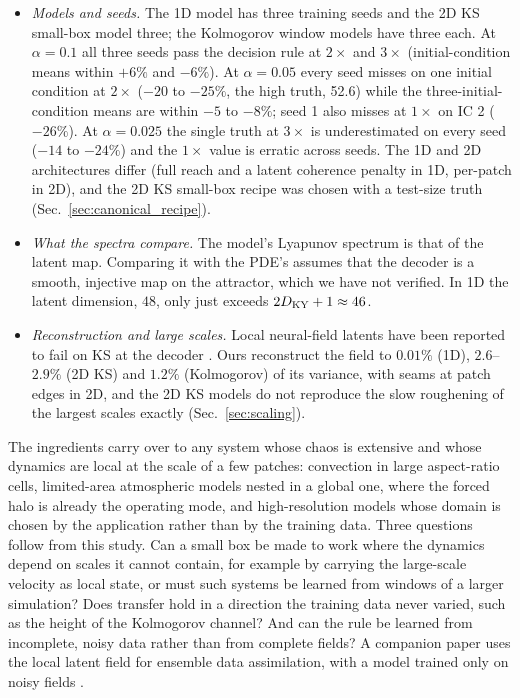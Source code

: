 \begin{itemize}
  scatter of single evaluations, the boundary at $\alpha=0.1$ and $2\times$ is
  not.
\item \emph{Models and seeds.} The 1D model has three training seeds and
  the 2D KS small-box model three; the Kolmogorov window models have three each.
  At $\alpha=0.1$ all three seeds pass the decision rule at $2\times$ and $3\times$
  (initial-condition means within $+6\%$ and $-6\%$). At $\alpha=0.05$ every seed
  misses on one initial condition at $2\times$ ($-20$ to $-25\%$, the high truth, 52.6)
  while the three-initial-condition means are within $-5$ to $-8\%$; seed 1 also misses at $1\times$ on IC 2 ($-26\%$). At $\alpha=0.025$
  the single truth at $3\times$ is underestimated on every seed ($-14$ to $-24\%$) and the
  $1\times$ value is erratic across seeds. The
  1D and 2D architectures differ (full reach and a latent coherence
  penalty in 1D, per-patch in 2D), and the 2D KS small-box recipe was
  chosen with a test-size truth (Sec.~\ref{sec:canonical_recipe}).
\item \emph{What the spectra compare.} The model's Lyapunov spectrum is
  that of the latent map. Comparing it with the PDE's assumes that the
  decoder is a smooth, injective map on the attractor, which we have not
  verified. In 1D the latent dimension, $48$, only just exceeds
  $2D_{\mathrm{KY}}+1\approx46$.
\item \emph{Reconstruction and large scales.} Local neural-field latents
  have been reported to fail on KS at the decoder \citep{aroma2024}. Ours
  reconstruct the field to $0.01\%$ (1D), $2.6$--$2.9\%$ (2D KS) and $1.2\%$
  (Kolmogorov) of its variance, with seams at patch edges in 2D, and the
  2D KS models do not reproduce the slow roughening of the largest scales
  exactly (Sec.~\ref{sec:scaling}).
\end{itemize}

 The ingredients carry over to any system whose chaos is
extensive and whose dynamics are local at the scale of a few patches:
convection in large aspect-ratio cells, limited-area atmospheric models
nested in a global one, where the forced halo is already the operating
mode, and high-resolution models whose domain is chosen by the
application rather than by the training data. Three questions follow
from this study. Can a small box be made to work where the dynamics
depend on scales it cannot contain, for example by carrying the
large-scale velocity as local state, or must such systems be learned from
windows of a larger simulation? Does transfer hold in a
direction the training data never varied, such as the height of the
Kolmogorov channel? And can the rule be learned from incomplete, noisy
data rather than from complete fields? A companion paper uses the local
latent field for ensemble data assimilation, with a model trained only on
noisy fields \citep{jones2026da}.
